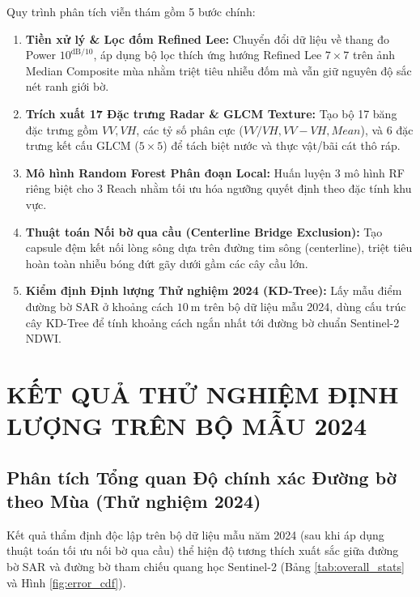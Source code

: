 \documentclass[11pt,a4paper]{article}
\begin{document}
Quy trình phân tích viễn thám gồm 5 bước chính:
\begin{enumerate}
    \item \textbf{Tiền xử lý \& Lọc đốm Refined Lee:} Chuyển đổi dữ liệu về thang đo Power $10^{\text{dB}/10}$, áp dụng bộ lọc thích ứng hướng Refined Lee $7\times7$ trên ảnh Median Composite mùa nhằm triệt tiêu nhiễu đốm mà vẫn giữ nguyên độ sắc nét ranh giới bờ.
    \item \textbf{Trích xuất 17 Đặc trưng Radar \& GLCM Texture:} Tạo bộ 17 băng đặc trưng gồm $VV, VH$, các tỷ số phân cực ($VV/VH, VV-VH, Mean$), và 6 đặc trưng kết cấu GLCM ($5\times5$) để tách biệt nước và thực vật/bãi cát thô ráp.
    \item \textbf{Mô hình Random Forest Phân đoạn Local:} Huấn luyện 3 mô hình RF riêng biệt cho 3 Reach nhằm tối ưu hóa ngưỡng quyết định theo đặc tính khu vực.
    \item \textbf{Thuật toán Nối bờ qua cầu (Centerline Bridge Exclusion):} Tạo capsule đệm kết nối lòng sông dựa trên đường tim sông (centerline), triệt tiêu hoàn toàn nhiễu bóng đứt gãy dưới gầm các cây cầu lớn.
    \item \textbf{Kiểm định Định lượng Thử nghiệm 2024 (KD-Tree):} Lấy mẫu điểm đường bờ SAR ở khoảng cách $10~\text{m}$ trên bộ dữ liệu mẫu 2024, dùng cấu trúc cây KD-Tree để tính khoảng cách ngắn nhất tới đường bờ chuẩn Sentinel-2 NDWI.
\end{enumerate}

\section{KẾT QUẢ THỬ NGHIỆM ĐỊNH LƯỢNG TRÊN BỘ MẪU 2024}

\subsection{Phân tích Tổng quan Độ chính xác Đường bờ theo Mùa (Thử nghiệm 2024)}

Kết quả thẩm định độc lập trên bộ dữ liệu mẫu năm 2024 (sau khi áp dụng thuật toán tối ưu nối bờ qua cầu) thể hiện độ tương thích xuất sắc giữa đường bờ SAR và đường bờ tham chiếu quang học Sentinel-2 (Bảng \ref{tab:overall_stats} và Hình \ref{fig:error_cdf}).
\end{document}
